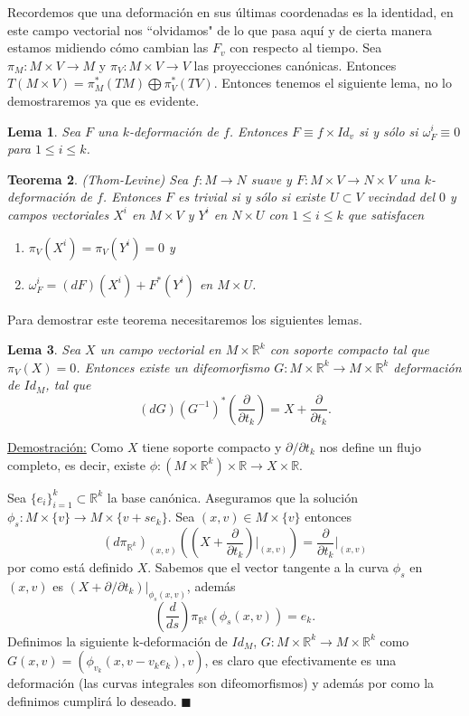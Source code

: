 \documentclass{report}
\newtheorem{theorem}{Teorema}[section]
\newtheorem{lem}[theorem]{Lema}
\theoremstyle{definition}
\begin{document}
Recordemos que una deformaci\'on en sus \'ultimas coordenadas es la identidad, en este campo vectorial nos ``olvidamos" de lo que pasa aqu\'i y de cierta manera estamos midiendo c\'omo cambian las $F_v$ con respecto al tiempo. Sea $\pi_M: M \times V \to M$ y $\pi_V: M \times V \to V$ las proyecciones can\'onicas. Entonces $T(M \times V ) = \pi_M^\ast (TM) \bigoplus \pi^\ast_V(TV)$. Entonces tenemos el siguiente lema, no lo demostraremos ya que es evidente.

\begin{lem}
Sea $F$ una $k$-deformaci\'on de $f$. Entonces $F \equiv f \times Id_v$ si y s\'olo si $\omega_F^{i} \equiv 0$ para $1 \leq i \leq k$.
\end{lem}

\begin{theorem}
(Thom-Levine) Sea $f:M \to N$ suave y $F: M \times V \to N \times V$ una $k$-deformaci\'on de $f$. Entonces $F$ es trivial si y s\'olo si existe $U \subset V$ vecindad del $0$ y campos vectoriales $X^{i}$ en $M \times V$ y $Y^{i} $ en $N \times U$ con $1 \leq i \leq k$ que satisfacen 
\begin{enumerate}
\item $\pi_V (X^{i})= \pi_V (Y^{i}) = 0$ y
\item $\omega^{i}_F =(dF)(X^{i}) + F^\ast (Y^{i})$ en $M \times U$.
\end{enumerate}
\end{theorem}

Para demostrar este teorema necesitaremos los siguientes lemas.

\begin{lem}
Sea $X$ un campo vectorial en $M \times \mathbb{R}^k$ con soporte compacto tal que $\pi_V (X)=0$. Entonces existe un difeomorfismo $G: M \times \mathbb{R}^k \to M \times \mathbb{R}^k$ deformaci\'on de $Id_M$, tal que $$(dG)(G^{-1})^\ast \left( \frac{\partial}{\partial t_k}\right) = X + \frac{\partial}{\partial t_k} .$$
\end{lem}

\underline{Demostraci\'on:} Como $X$ tiene soporte compacto y $\partial/\partial t_k$ nos define un flujo completo, es decir, existe $\phi: (M \times \mathbb{R}^k) \times \mathbb{R} \to X \times \mathbb{R}$.

Sea $\{ e_i \}_{i=1}^k \subset \mathbb{R}^k$ la base can\'onica. Aseguramos que la soluci\'on $\phi_s: M \times \{ v \} \to M \times \{ v + s e_k \}$. Sea $(x,v) \in M \times \{ v \}$ entonces $$(d \pi_{\mathbb{R}^k})_{(x,v)} \left( \left( X + \frac{\partial}{\partial t_k} \right) \vert_{(x,v)} \right) = \frac{\partial}{\partial t_k} \vert_{(x,v)}$$
por como est\'a definido $X$. Sabemos que el vector tangente a la curva $\phi_s$ en $(x,v)$ es $( X + \partial / \partial t_k)\vert_{\phi_s(x,v)}$, adem\'as $$\left ( \frac{d}{ds} \right) \pi_{\mathbb{R}^k} (\phi_s (x,v))= e_k .$$
Definimos la siguiente k-deformaci\'on de $Id_M$, $G: M \times \mathbb{R}^k \to M \times \mathbb{R}^k$ como $G(x,v) = (\phi_{v_k}(x, v- v_k e_k) , v)$, es claro que efectivamente es una deformaci\'on (las curvas integrales son difeomorfismos) y adem\'as por como la definimos cumplir\'a lo deseado. $\blacksquare$
\end{document}
